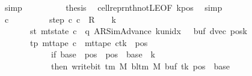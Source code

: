 \begin{isabellebody}
\ simp\isanewline
\ \ \ \ \ \ \ \ \isamarkupfalse%
\ {\isacharquery}{\kern0pt}thesis\ \isamarkupfalse%
\ cell{\isacharunderscore}{\kern0pt}repr{\isacharunderscore}{\kern0pt}nth{\isacharunderscore}{\kern0pt}not{\isacharunderscore}{\kern0pt}LE{}{\isacharbrackleft}{\kern0pt}OF\ kpos{\isacharbrackright}{\kern0pt}\ \isamarkupfalse%
\ simp\isanewline
\ \ \ \ \ \ \isamarkupfalse%
\isanewline
\ \ \ \ \isamarkupfalse%
\isanewline
\ \ \ \ \isamarkupfalse%
\ c{\isacharprime}{\kern0pt}{\isacharprime}{\kern0pt}\ \isanewline
\ \ \ \ \ \ \ \ step{\isacharcolon}{\kern0pt}\ {\isachardoublequoteopen}{\isacharparenleft}{\kern0pt}c{\isacharprime}{\kern0pt}{\isacharcomma}{\kern0pt}\ c{\isacharprime}{\kern0pt}{\isacharprime}{\kern0pt}{\isacharparenright}{\kern0pt}\ {\isasymin}\ {\isacharquery}{\kern0pt}R\ {\isacharcircum}{\kern0pt}{\isacharcircum}{\kern0pt}\ {\isacharparenleft}{\kern0pt}{}\ {\isacharasterisk}{\kern0pt}\ {\isacharquery}{\kern0pt}k{\isacharparenright}{\kern0pt}{\isachardoublequoteclose}\isanewline
\ \ \ \ \ \ \ st{\isacharcolon}{\kern0pt}\ {\isachardoublequoteopen}mt{\isacharunderscore}{\kern0pt}state\ c{\isacharprime}{\kern0pt}{\isacharprime}{\kern0pt}\ {\isacharequal}{\kern0pt}\ {\isacharparenleft}{\kern0pt}q{\isacharcomma}{\kern0pt}\ AR{\isacharunderscore}{\kern0pt}SimAdvance{\isacharcomma}{\kern0pt}\ k{\isacharunderscore}{\kern0pt}unidx\ {}{\isacharcomma}{\kern0pt}\ {}{\isacharcomma}{\kern0pt}\ buf{\isacharcomma}{\kern0pt}\ dvec{\isacharcomma}{\kern0pt}\ posk{\isacharparenright}{\kern0pt}{\isachardoublequoteclose}\isanewline
\ \ \ \ \ \ \ tp{\isacharcolon}{\kern0pt}\ {\isachardoublequoteopen}mt{\isacharunderscore}{\kern0pt}tape\ c{\isacharprime}{\kern0pt}{\isacharprime}{\kern0pt}\ {\isacharequal}{\kern0pt}\ {\isacharparenleft}{\kern0pt}mt{\isacharunderscore}{\kern0pt}tape\ c{\isacharprime}{\kern0pt}{\isacharparenright}{\kern0pt}{\isacharparenleft}{\kern0pt}tk\ {\isacharcolon}{\kern0pt}{\isacharequal}{\kern0pt}\ {\isacharparenleft}{\kern0pt}{\isasymlambda}pos{\isachardot}{\kern0pt}\isanewline
\ \ \ \ \ \ \ \ \ \ \ \ if\ {\isacharquery}{\kern0pt}base\ {\isasymle}\ pos\ {\isasymand}\ pos\ {\isacharless}{\kern0pt}\ {\isacharquery}{\kern0pt}base\ {\isacharplus}{\kern0pt}\ {\isacharquery}{\kern0pt}k\isanewline
\ \ \ \ \ \ \ \ \ \ \ \ then\ write{\isacharunderscore}{\kern0pt}bit\ {\isacharparenleft}{\kern0pt}{\isasymGamma}{\isacharunderscore}{\kern0pt}tm\ M{\isacharparenright}{\kern0pt}\ {\isacharparenleft}{\kern0pt}bl{\isacharunderscore}{\kern0pt}tm\ M{\isacharparenright}{\kern0pt}\ {\isacharparenleft}{\kern0pt}buf\ tk{\isacharparenright}{\kern0pt}\ {\isacharparenleft}{\kern0pt}pos\ {\isacharminus}{\kern0pt}\ {\isacharquery}{\kern0pt}base{\isacharparenright}{\kern0pt}\isanewline

\end{isabellebody}
